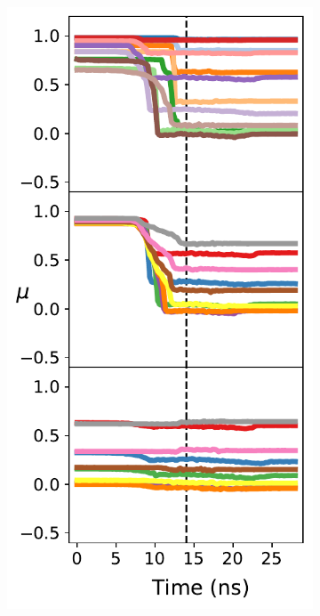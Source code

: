 
\begin{figure}
    \centering
\begin{subfigure}{0.39\textwidth}
    \centering
    \smallskip
    \includegraphics[width=\linewidth]{figures/MD/Alloys/Mix_Au-Cu.pdf}

\end{subfigure}
\end{figure}
